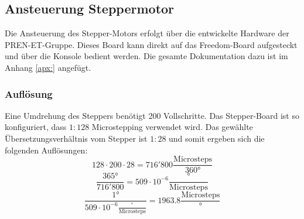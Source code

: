     \subsection{Ansteuerung Steppermotor}
    \label{sec:StepperAnsteuerung}
        Die Ansteuerung des Stepper-Motors erfolgt über die entwickelte Hardware der PREN-ET-Gruppe. 
        Dieses Board kann direkt auf das Freedom-Board aufgesteckt und über die Konsole bedient 
        werden. Die gesamte Dokumentation dazu ist im Anhang \ref{apx:} angefügt. 
        
        \subsubsection{Auflösung}
        \label{sec:Aufloesung}
            Eine Umdrehung des Steppers benötigt 200 Vollschritte. Das Stepper-Board ist so konfiguriert, 
            dass $1:128$ Microstepping verwendet wird. Das gewählte Übersetzungsverhältnis vom 
            Stepper ist $1:28$ und somit ergeben sich die folgenden Auflösungen:
            \begin{equation}
                128 \cdot 200 \cdot 28 = 716'800\frac{\text{Microsteps}}{360\si{\degree}}
            \end{equation}
            \begin{equation}
                \frac{365\si{\degree}}{716'800} = 509 \cdot 10^{-6}\frac{\si{\degree}}{\text{Microsteps}}
            \end{equation}
            \begin{equation}
               \frac{1\si{\degree}}{509 \cdot 10^{-6}\frac{\si{\degree}}{\text{Microsteps}}} = 1963.8\frac{\text{Microsteps}}{\si{\degree}}
            \end{equation}
            